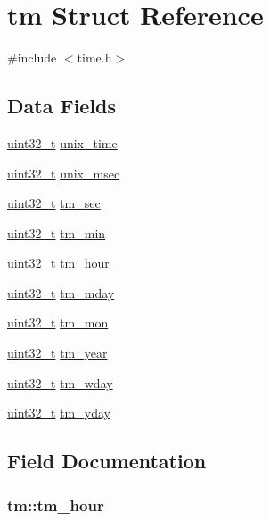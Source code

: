 \hypertarget{structtm}{\section{tm Struct Reference}
\label{structtm}
}


{\ttfamily \#include $<$time.\-h$>$}

\subsection*{Data Fields}
\begin{DoxyCompactItemize}
\item 
\hyperlink{common_8h_a0ddb3f43e52282b59ee55d059ed74a28}{uint32\-\_\-t} \hyperlink{structtm_a8b444400d47ad20f01dfffdfb7481d8d}{unix\-\_\-time}
\item 
\hyperlink{common_8h_a0ddb3f43e52282b59ee55d059ed74a28}{uint32\-\_\-t} \hyperlink{structtm_a6a0b887ef2d300429ce3b807bca855e2}{unix\-\_\-msec}
\item 
\hyperlink{common_8h_a0ddb3f43e52282b59ee55d059ed74a28}{uint32\-\_\-t} \hyperlink{structtm_ad138117367ca2d1aa1b50dff4306cad3}{tm\-\_\-sec}
\item 
\hyperlink{common_8h_a0ddb3f43e52282b59ee55d059ed74a28}{uint32\-\_\-t} \hyperlink{structtm_a8795928685a8da0df53de0cfa1cb1a51}{tm\-\_\-min}
\item 
\hyperlink{common_8h_a0ddb3f43e52282b59ee55d059ed74a28}{uint32\-\_\-t} \hyperlink{structtm_a11fc0ba27d2eb1f55e72956d5555a255}{tm\-\_\-hour}
\item 
\hyperlink{common_8h_a0ddb3f43e52282b59ee55d059ed74a28}{uint32\-\_\-t} \hyperlink{structtm_a55163a11263b30f96b72f5a3bd675cb5}{tm\-\_\-mday}
\item 
\hyperlink{common_8h_a0ddb3f43e52282b59ee55d059ed74a28}{uint32\-\_\-t} \hyperlink{structtm_a8a9735a7cbfe839de5e48eeb1beb559e}{tm\-\_\-mon}
\item 
\hyperlink{common_8h_a0ddb3f43e52282b59ee55d059ed74a28}{uint32\-\_\-t} \hyperlink{structtm_ab6b14f39f1a3170952a484b05cdedecb}{tm\-\_\-year}
\item 
\hyperlink{common_8h_a0ddb3f43e52282b59ee55d059ed74a28}{uint32\-\_\-t} \hyperlink{structtm_a9f8125ef8eba5bc564156f954c215efe}{tm\-\_\-wday}
\item 
\hyperlink{common_8h_a0ddb3f43e52282b59ee55d059ed74a28}{uint32\-\_\-t} \hyperlink{structtm_a352f5ae06f76c1e07e3c79f0d10fa869}{tm\-\_\-yday}
\end{DoxyCompactItemize}


\subsection{Field Documentation}
\hypertarget{structtm_a11fc0ba27d2eb1f55e72956d5555a255}{
\subsubsection[{tm\-\_\-hour}]{ tm\-::tm\-\_\-hour}}\label{structtm_a11fc0ba27d2eb1f55e72956d5555a255}


